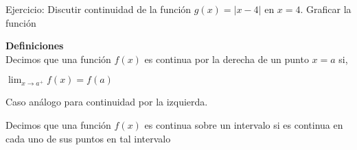\documentclass[11pt, a4paper]{article}
\begin{document}
{{\color{magenta} Ejercicio: Discutir continuidad de la funci\'on $g(x) = | x - 4 |$ en $x = 4$. Graficar la funci\'on } \\ 

\begin{center}
    \textbf{Definiciones} \\ 
    Decimos que una funci\'on $f(x)$ es {\color{blue}continua por la derecha} de un punto $x=a$ si, \\ \hfill

    {\color{blue} $\displaystyle \lim_{x \to a^{+}} f(x) = f(a) $} \\ \hfill
    
    Caso an\'alogo para continuidad por la izquierda. \\ \hfill

    Decimos que una funci\'on $f(x)$ es {\color{blue} continua sobre un intervalo} si es continua en cada uno de sus puntos en tal intervalo  
    
\end{center}

\newpage

}
\end{document}
